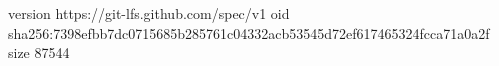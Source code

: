 version https://git-lfs.github.com/spec/v1
oid sha256:7398efbb7dc0715685b285761c04332acb53545d72ef617465324fcca71a0a2f
size 87544

